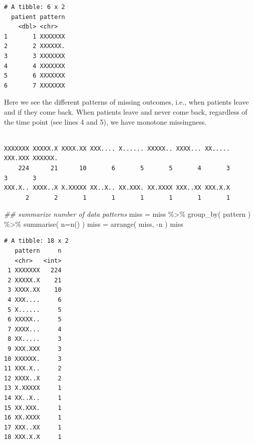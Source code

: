 \documentclass[
  letterpaper,
  DIV=11,
  numbers=noendperiod]{scrreprt}
\newenvironment{Shaded}{}{}
\newcommand{\AttributeTok}[1]{\textcolor[rgb]{0.49,0.56,0.16}{#1}}
\newcommand{\ConstantTok}[1]{\textcolor[rgb]{0.53,0.00,0.00}{#1}}
\newcommand{\DocumentationTok}[1]{\textcolor[rgb]{0.73,0.13,0.13}{\textit{#1}}}
\newcommand{\FunctionTok}[1]{\textcolor[rgb]{0.02,0.16,0.49}{#1}}
\newcommand{\NormalTok}[1]{#1}
\newcommand{\OtherTok}[1]{\textcolor[rgb]{0.00,0.44,0.13}{#1}}
\newcommand{\SpecialCharTok}[1]{\textcolor[rgb]{0.25,0.44,0.63}{#1}}
\begin{document}
\begin{verbatim}
# A tibble: 6 x 2
  patient pattern
    <dbl> <chr>  
1       1 XXXXXXX
2       2 XXXXXX.
3       3 XXXXXXX
4       4 XXXXXXX
5       6 XXXXXXX
6       7 XXXXXXX
\end{verbatim}

Here we see the different patterns of missing outcomes, i.e., when
patients leave and if they come back. When patients leave and never come
back, regardless of the time point (see lines 4 and 5), we have monotone
missingness.

\begin{Shaded}
\end{Shaded}

\begin{verbatim}

XXXXXXX XXXXX.X XXXX.XX XXX.... X...... XXXXX.. XXXX... XX..... XXX.XXX XXXXXX. 
    224      21      10       6       5       5       4       3       3       3 
XXX.X.. XXXX..X X.XXXXX XX..X.. XX.XXX. XX.XXXX XXX..XX XXX.X.X 
      2       2       1       1       1       1       1       1 
\end{verbatim}

\begin{Shaded}
\begin{Highlighting}[]
\DocumentationTok{\#\# summarize number of data patterns }
\NormalTok{miss }\OtherTok{=}\NormalTok{ miss }\SpecialCharTok{\%\textgreater{}\%} \FunctionTok{group\_by}\NormalTok{( pattern ) }\SpecialCharTok{\%\textgreater{}\%}
    \FunctionTok{summarise}\NormalTok{( }\AttributeTok{n=}\FunctionTok{n}\NormalTok{() )}
\NormalTok{miss }\OtherTok{=} \FunctionTok{arrange}\NormalTok{( miss, }\SpecialCharTok{{-}}\NormalTok{n )}
\NormalTok{miss}
\end{Highlighting}
\end{Shaded}

\begin{verbatim}
# A tibble: 18 x 2
   pattern     n
   <chr>   <int>
 1 XXXXXXX   224
 2 XXXXX.X    21
 3 XXXX.XX    10
 4 XXX....     6
 5 X......     5
 6 XXXXX..     5
 7 XXXX...     4
 8 XX.....     3
 9 XXX.XXX     3
10 XXXXXX.     3
11 XXX.X..     2
12 XXXX..X     2
13 X.XXXXX     1
14 XX..X..     1
15 XX.XXX.     1
16 XX.XXXX     1
17 XXX..XX     1
18 XXX.X.X     1
\end{verbatim}
\end{document}
